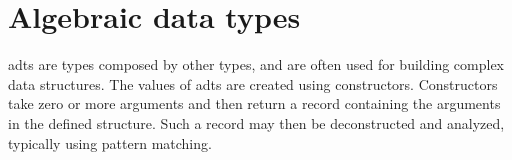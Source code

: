 \section{Algebraic data types}

\Glspl{adt} are types composed by other types, and are often used for building complex data structures. The values of \glspl{adt} are created using constructors. Constructors take zero or more arguments and then return a record containing the arguments in the defined structure. Such a record may then be deconstructed and analyzed, typically using pattern matching.